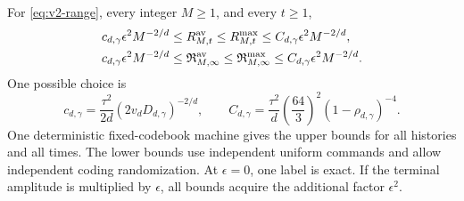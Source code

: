 \begin{theorem}
\label{thm:v2-refresh}
For \eqref{eq:v2-range}, every integer $M\ge1$, and every $t\ge1$,
\begin{align*}
 c_{d,\gamma}\epsilon^2M^{-2/d}
 &\le R_{M,t}^{\rm av}\le R_{M,t}^{\rm max}
       \le C_{d,\gamma}\epsilon^2M^{-2/d},\\
 c_{d,\gamma}\epsilon^2M^{-2/d}
 &\le\mathfrak R_{M,\infty}^{\rm av}
       \le\mathfrak R_{M,\infty}^{\rm max}
       \le C_{d,\gamma}\epsilon^2M^{-2/d}.
\end{align*}
One possible choice is
\begin{equation}\label{eq:v2-explicit-constants}
 c_{d,\gamma}=\frac{\tau^2}{2d}(2v_dD_{d,\gamma})^{-2/d},\qquad
 C_{d,\gamma}=\frac{\tau^2}{d}\left(\frac{64}{3}\right)^2
                    (1-\rho_{d,\gamma})^{-4}.
\end{equation}
One deterministic fixed-codebook machine gives the upper bounds for all
histories and all times. The lower bounds use independent uniform
commands and allow independent coding randomization. At $\epsilon=0$,
one label is exact. If the terminal amplitude is multiplied by $\epsilon$,
all bounds acquire the additional factor $\epsilon^2$.
\end{theorem}
